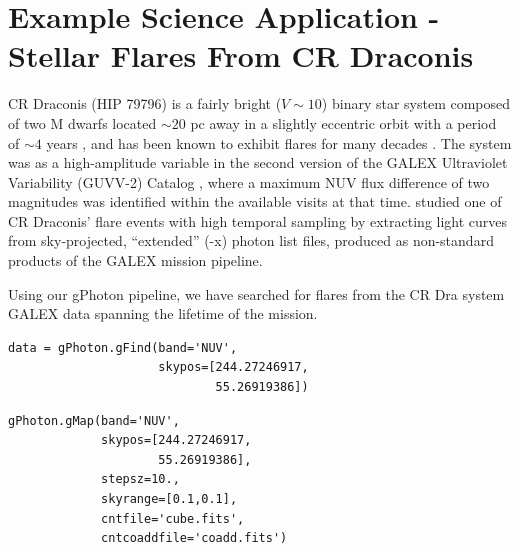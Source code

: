 \documentclass[trackchanges,preprint2]{aastex}
\begin{document}
\section{Example Science Application - Stellar Flares From CR Draconis}
\label{scienceexamples}
CR Draconis (HIP 79796) is a fairly bright ($V \sim 10$) binary star system composed of two M dwarfs located $\sim 20$ pc away in a slightly eccentric orbit with a period of $\sim 4$ years \citep{tam2008}, and has been known to exhibit flares for many decades \citep{cri1970}. The system was  as a high-amplitude variable in the second version of the GALEX Ultraviolet Variability (GUVV-2) Catalog \citep{whe2008}, where a maximum NUV flux difference of two magnitudes was identified within the available visits at that time. \citet{wel2006} studied one of CR Draconis' flare events with high temporal sampling by extracting light curves from sky-projected, ``extended'' (-x) photon list files, produced as non-standard products of the GALEX mission pipeline.

Using our gPhoton pipeline, we have searched for flares from the CR Dra system  GALEX data spanning the lifetime of the mission. 

\begin{verbatim}
data = gPhoton.gFind(band='NUV',
                     skypos=[244.27246917,
                             55.26919386])
\end{verbatim}



\begin{verbatim}
gPhoton.gMap(band='NUV',
             skypos=[244.27246917,
                     55.26919386],
             stepsz=10.,
             skyrange=[0.1,0.1],
             cntfile='cube.fits',
             cntcoaddfile='coadd.fits')
\end{verbatim}
\end{document}
